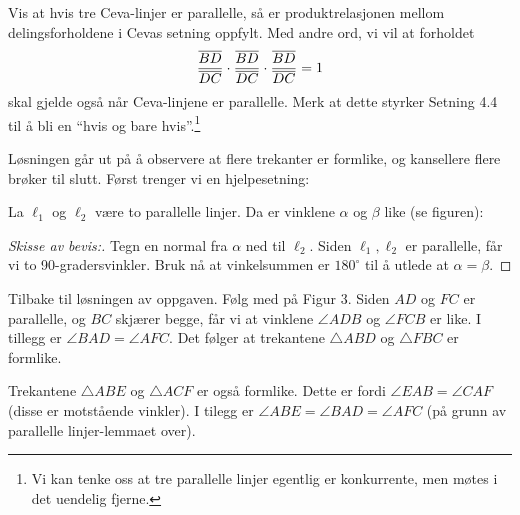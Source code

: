 \documentclass[11pt, norsk]{article}
\begin{document}
\begin{oppg}
 Vis at hvis tre Ceva-linjer er parallelle, så er produktrelasjonen mellom delingsforholdene i Cevas setning oppfylt. Med andre ord, vi vil at forholdet
$$
\frac{\overline{BD}}{\overline{DC}} \cdot
\frac{\overline{BD}}{\overline{DC}} \cdot
\frac{\overline{BD}}{\overline{DC}} = 1
$$
skal gjelde også når Ceva-linjene er parallelle. Merk at dette styrker Setning 4.4 til å bli en ``hvis og bare hvis''.\footnote{Vi kan tenke oss at tre parallelle linjer egentlig er konkurrente, men møtes i det uendelig fjerne.}
\end{oppg}
\begin{losn}

Løsningen går ut på å observere at flere trekanter er formlike, og kansellere flere brøker til slutt. Først trenger vi en hjelpesetning:

\begin{lemma}
  La $\ell_1$ og $\ell_2$ være to parallelle linjer. Da er vinklene $\alpha$ og $\beta$ like (se figuren):
\begin{center}
\end{center}
\end{lemma}
\begin{proof}[Skisse av bevis:]
Tegn en normal fra $\alpha$ ned til $\ell_2$. Siden $\ell_1,\ell_2$ er parallelle, får vi to 90-gradersvinkler. Bruk nå at vinkelsummen er $180^\circ$ til å utlede at $\alpha=\beta$.
\end{proof}

Tilbake til løsningen av oppgaven. Følg med på Figur 3. Siden $AD$ og $FC$ er parallelle, og $BC$ skjærer begge, får vi at vinklene $\angle ADB$ og $\angle FCB$ er like. I tillegg er $\angle BAD=\angle AFC$. Det følger at trekantene $\triangle ABD$ og $\triangle FBC$ er formlike.

Trekantene $\triangle ABE$ og $\triangle ACF$ er også formlike. Dette er fordi $\angle EAB=\angle CAF$ (disse er motstående vinkler). I tilegg er $\angle ABE=\angle BAD = \angle AFC$ (på grunn av parallelle linjer-lemmaet over). 


\end{losn}
\end{document}
